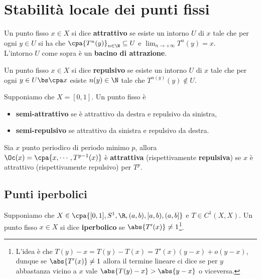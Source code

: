 \chapter{Stabilit\`a locale dei punti fissi}
\begin{definition}
Un punto fisso $x\in X$ si dice \textbf{attrattivo} se esiste un intorno $U$ di $x$ tale che per ogni $y\in U$ si ha che $\cpa{T^n(y)}_{n\in\N}\subseteq U$ e $\displaystyle\lim_{n\to+\infty}T^n(y)=x$.\\
L'intorno $U$ come sopra \`e un \textbf{bacino di attrazione}.
\vspace{0.25cm}

\noindent
Un punto fisso $x\in X$ si dice \textbf{repulsivo} se esiste un intorno $U$ di $x$ tale che per ogni $y\in U\bs \cpa x$ esiste $n(y)\in\N$ tale che $T^{n(y)}(y)\notin U$.
\end{definition}

\begin{definition}
Supponiamo che $X=[0,1]$. Un punto fisso \`e
\begin{itemize}
\item \textbf{semi-attrattivo} se \`e attrattivo da destra e repulsivo da sinistra,
\item \textbf{semi-repulsivo} se attrattivo da sinistra e repulsivo da destra.
\end{itemize}
\end{definition}

\begin{definition}
Sia $x$ punto periodico di periodo minimo $p$, allora $\Oc(x)=\cpa{x,\cdots, T^{p-1}(x)}$ \`e \textbf{attrattiva} (rispettivamente \textbf{repulsiva}) se $x$ \`e attrattivo (rispettivamente repulsivo) per $T^p$.
\end{definition}

\section{Punti iperbolici}
\begin{definition}
Supponiamo che $X\in\cpa{[0,1], S^1, \R, (a,b), [a,b), (a,b]}$ e $T\in C^1(X,X)$. Un punto fisso $x\in X$ si dice \textbf{iperbolico} se $\abs{T'(x)}\neq 1$\footnote{L'idea \`e che $T(y)-x=T(y)-T(x)=T'(x)(y-x)+o(y-x)$, dunque se $\abs{T'(x)}\neq 1$ allora il termine lineare ci dice se per $y$ abbastanza vicino a $x$ vale $\abs{T(y)-x}>\abs{y-x}$ o viceversa.}.
\end{definition}

